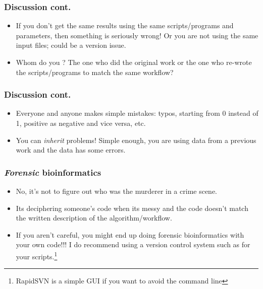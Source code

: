 \begin{frame}[allowframebreaks]
  \frametitle{Discussion cont.}
  \begin{itemize}
  \item If you don't get the same results using the same scripts/programs and parameters, then something is \alert{seriously} wrong! Or you are not using the same input files; could be a version issue.
  \item Whom do you \emph{}? The one who did the original work or the one who re-wrote the scripts/programs to match the same workflow?
  \end{itemize}
\end{frame}

\begin{frame}[allowframebreaks]
  \frametitle{Discussion cont.}
  \begin{itemize}
  \item Everyone and anyone makes simple mistakes: typos, starting from 0 instead of 1, positive as negative and vice versa, etc.
  \item You can \emph{inherit} problems! Simple enough, you are using data from a previous work and the data has some errors.
  \end{itemize}
\end{frame}

\begin{frame}[allowframebreaks]
  \frametitle{\emph{Forensic} bioinformatics}
  \begin{itemize}
  \item No, it's not to figure out who was the murderer in a crime scene.
  \item Its deciphering someone's code when its messy and the code doesn't match the written description of the algorithm/workflow.
  \item If you aren't careful, you might end up doing forensic bioinformatics with your own code!!! I do recommend using a version control system such as  for your scripts.\footnote{RapidSVN is a simple GUI if you want to avoid the command line}
  \end{itemize}
\end{frame}

